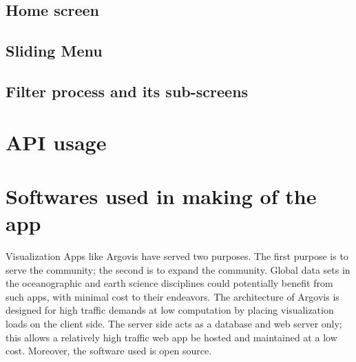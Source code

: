 \subsection{Home screen}
\subsection{Sliding Menu}
\subsection{Filter process and its sub-screens}

\section{API usage}
\section{Softwares used in making of the app}

Visualization Apps like Argovis have served two purposes. The first purpose is to serve the community; the second is to expand the community. Global data sets in the oceanographic and earth science disciplines could potentially benefit from such apps, with minimal cost to their endeavors. The architecture of Argovis is designed for high traffic demands at low computation by placing visualization loads on the client side. The server side acts as a database and web server only; this allows a relatively high traffic web app be hosted and maintained at a low cost. Moreover, the software used is open source. 

